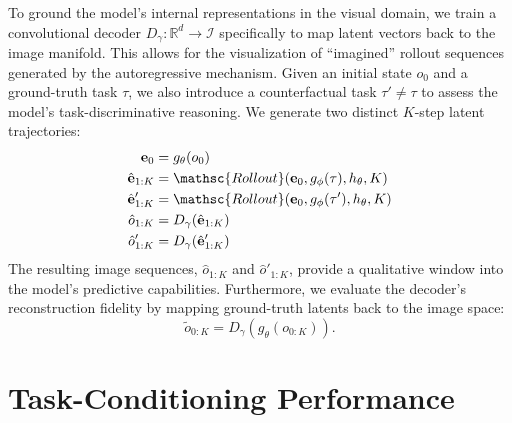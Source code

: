 To ground the model's internal representations in the visual domain, we train a convolutional decoder $D_\gamma: \mathbb{R}^d \to \mathcal{I}$ specifically to map latent vectors back to the image manifold. This allows for the visualization of ``imagined'' rollout sequences generated by the autoregressive mechanism. Given an initial state $o_0$ and a ground-truth task $\tau$, we also introduce a counterfactual task $\tau' \neq \tau$ to assess the model's task-discriminative reasoning. We generate two distinct $K$-step latent trajectories:
\begin{subequations}
	\begin{align}
		\mathbf{e}_0            & = g_\theta(o_0)                                                                          \\
		\hat{\mathbf{e}}_{1:K}  & = \mathsc{Rollout}(\mathbf{e}_0, g_\phi(\tau), h_\theta, K) \label{eq:open_ro_correct}   \\
		\hat{\mathbf{e}}'_{1:K} & = \mathsc{Rollout}(\mathbf{e}_0, g_\phi(\tau'), h_\theta, K) \label{eq:open_ro_wrong}    \\
		\hat{o}_{1:K}           & = D_\gamma(\hat{\mathbf{e}}_{1:K})                           \label{eq:decoding_correct} \\
		\hat{o}'_{1:K}          & = D_\gamma(\hat{\mathbf{e}}'_{1:K}) \label{eq:decoding_wrong}
	\end{align}
\end{subequations}
The resulting image sequences, $\hat{o}_{1:K}$ and $\hat{o}'_{1:K}$, provide a qualitative window into the model’s predictive capabilities. Furthermore, we evaluate the decoder's reconstruction fidelity by mapping ground-truth latents back to the image space:
\begin{equation}
	\tilde{o}_{0:K} = D_\gamma(g_\theta(o_{0:K})) .
	\label{eq:reconst_obs}
\end{equation}


\section{Task-Conditioning Performance}
\label{sec:task_performance}

